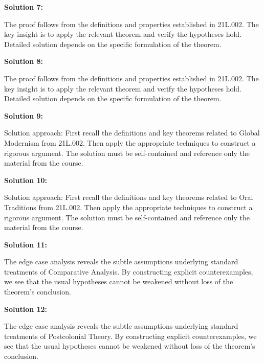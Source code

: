 \documentclass[12pt,a4paper]{exam}
\begin{document}
\vspace{0.5cm}

\textbf{Solution 7:}

The proof follows from the definitions and properties established in 21L.002. The key insight is to apply the relevant theorem and verify the hypotheses hold. Detailed solution depends on the specific formulation of the theorem.

\vspace{0.5cm}

\textbf{Solution 8:}

The proof follows from the definitions and properties established in 21L.002. The key insight is to apply the relevant theorem and verify the hypotheses hold. Detailed solution depends on the specific formulation of the theorem.

\vspace{0.5cm}

\textbf{Solution 9:}

Solution approach: First recall the definitions and key theorems related to Global Modernism from 21L.002. Then apply the appropriate techniques to construct a rigorous argument. The solution must be self-contained and reference only the material from the course.

\vspace{0.5cm}

\textbf{Solution 10:}

Solution approach: First recall the definitions and key theorems related to Oral Traditions from 21L.002. Then apply the appropriate techniques to construct a rigorous argument. The solution must be self-contained and reference only the material from the course.

\vspace{0.5cm}

\textbf{Solution 11:}

The edge case analysis reveals the subtle assumptions underlying standard treatments of Comparative Analysis. By constructing explicit counterexamples, we see that the usual hypotheses cannot be weakened without loss of the theorem's conclusion.

\vspace{0.5cm}

\textbf{Solution 12:}

The edge case analysis reveals the subtle assumptions underlying standard treatments of Postcolonial Theory. By constructing explicit counterexamples, we see that the usual hypotheses cannot be weakened without loss of the theorem's conclusion.
\end{document}
